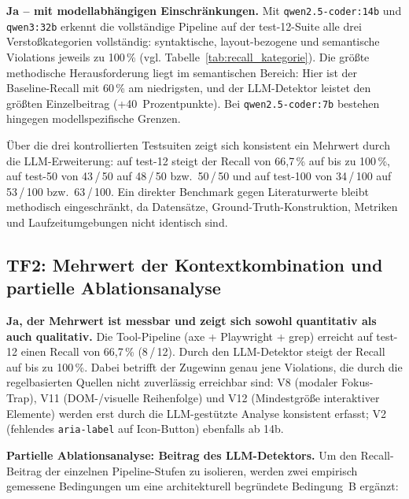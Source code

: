 \textbf{Ja -- mit modellabhängigen Einschränkungen.} Mit \texttt{qwen2.5-coder:14b} und \texttt{qwen3:32b} erkennt die vollständige Pipeline auf der test-12-Suite alle drei Verstoßkategorien vollständig: syntaktische, layout-bezogene und semantische Violations jeweils zu 100\,\% (vgl. Tabelle~\ref{tab:recall_kategorie}). Die größte methodische Herausforderung liegt im semantischen Bereich: Hier ist der Baseline-Recall mit 60\,\% am niedrigsten, und der \ac{LLM}-Detektor leistet den größten Einzelbeitrag (+40~Prozentpunkte). Bei \texttt{qwen2.5-coder:7b} bestehen hingegen modellspezifische Grenzen.

Über die drei kontrollierten Testsuiten zeigt sich konsistent ein Mehrwert durch die \ac{LLM}-Erweiterung: auf test-12 steigt der Recall von 66,7\,\% auf bis zu 100\,\%, auf test-50 von 43\,/\,50 auf 48\,/\,50 bzw.\ 50\,/\,50 und auf test-100 von 34\,/\,100 auf 53\,/\,100 bzw.\ 63\,/\,100. Ein direkter Benchmark gegen Literaturwerte bleibt methodisch eingeschränkt, da Datensätze, Ground-Truth-Konstruktion, Metriken und Laufzeitumgebungen nicht identisch sind.

\subsection{TF2: Mehrwert der Kontextkombination und partielle Ablationsanalyse}
\label{sec:ff_tf2}

\textbf{Ja, der Mehrwert ist messbar und zeigt sich sowohl quantitativ als auch qualitativ.} Die Tool-Pipeline (axe + Playwright + grep) erreicht auf test-12 einen Recall von 66{,}7\,\% (8\,/\,12). Durch den \ac{LLM}-Detektor steigt der Recall auf bis zu 100\,\%. Dabei betrifft der Zugewinn genau jene Violations, die durch die regelbasierten Quellen nicht zuverlässig erreichbar sind: V8 (modaler Fokus-Trap), V11 (\ac{DOM}-/visuelle Reihenfolge) und V12 (Mindestgröße interaktiver Elemente) werden erst durch die \ac{LLM}-gestützte Analyse konsistent erfasst; V2 (fehlendes \texttt{aria-label} auf Icon-Button) ebenfalls ab 14b.

\textbf{Partielle Ablationsanalyse: Beitrag des \ac{LLM}-Detektors.}
Um den Recall-Beitrag der einzelnen Pipeline-Stufen zu isolieren, werden zwei empirisch gemessene Bedingungen um eine architekturell begründete Bedingung~B ergänzt:

